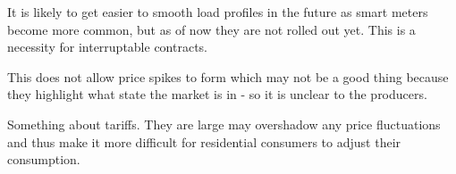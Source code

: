 It is likely to get easier to smooth load profiles in the future as smart meters become more common, but as of now they are not rolled out yet. This is a necessity for interruptable contracts.

This does not allow price spikes to form which may not be a good thing because they highlight what state the market is in - so it is unclear to the producers.

Something about tariffs. They are large may overshadow any price fluctuations and thus make it more difficult for residential consumers to adjust their consumption.

\citep{kirschen2003demand}

